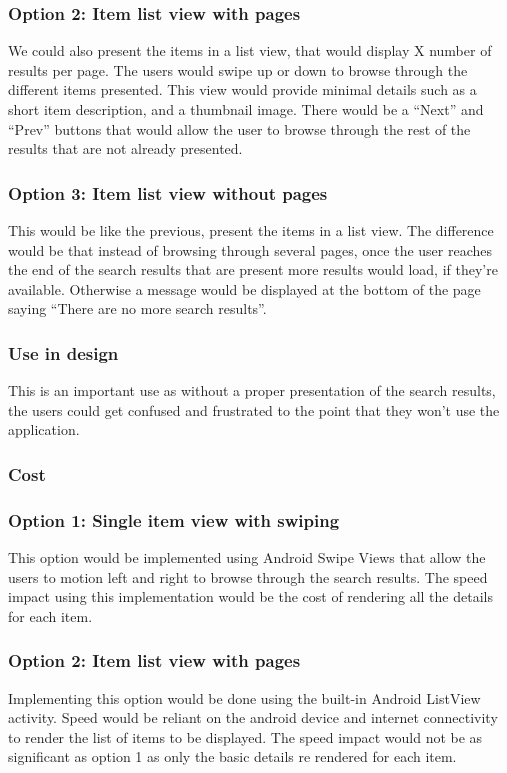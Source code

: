 \documentclass[journal,compsoc, 10pt, draftclsnofoot, onecolumn]{IEEEtran}
\begin{document}
\subsubsection*{Option 2: Item list view with pages}

We could also present the items in a list view, that would display X number of 
results per page. The users would swipe up or down to browse through the different 
items presented. This view would provide minimal details such as a short item 
description, and a thumbnail image. There would be a ``Next'' and ``Prev'' buttons 
that would allow the user to browse through the rest of the results that are not 
already presented.

\subsubsection*{Option 3: Item list view without pages}
This would be like the previous, present the items in a list view. The difference 
would be that instead of browsing through several pages, once the user reaches the 
end of the search results that are present more results would load, if they're 
available. Otherwise a message would be displayed at the bottom of the page saying 
``There are no more search results''.

\subsubsection*{Use in design}
This is an important use as without a proper presentation of the search results, 
the users could get confused and frustrated to the point that they won't use the 
application.
\subsubsection*{Cost}
\subsubsection*{Option 1: Single item view with swiping}
This option would be implemented using Android Swipe Views that allow the users 
to motion left and right to browse through the search results. The speed impact 
using this implementation would be the cost of rendering all the details for each 
item. 
\subsubsection*{Option 2: Item list view with pages}
Implementing this option would be done using the built-in Android ListView 
activity. Speed would be reliant on the android device and internet connectivity 
to render the list of items to be displayed. The speed impact would not be as 
significant as option 1 as only the basic details re rendered for each item.
\end{document}
